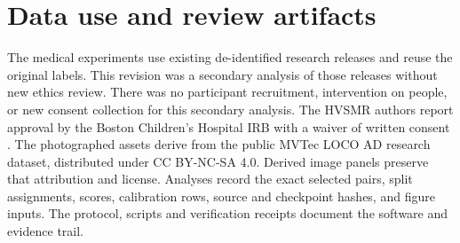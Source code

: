\section{Data use and review artifacts}
The medical experiments use existing de-identified research releases and reuse the original labels. This revision was a secondary analysis of those releases without new ethics review. There was no participant recruitment, intervention on people, or new consent collection for this secondary analysis. The HVSMR authors report approval by the Boston Children's Hospital IRB with a waiver of written consent \cite{pace2024}. The photographed assets derive from the public MVTec LOCO AD research dataset, distributed under CC BY-NC-SA 4.0. Derived image panels preserve that attribution and license. Analyses record the exact selected pairs, split assignments, scores, calibration rows, source and checkpoint hashes, and figure inputs. The protocol, scripts and verification receipts document the software and evidence trail.

